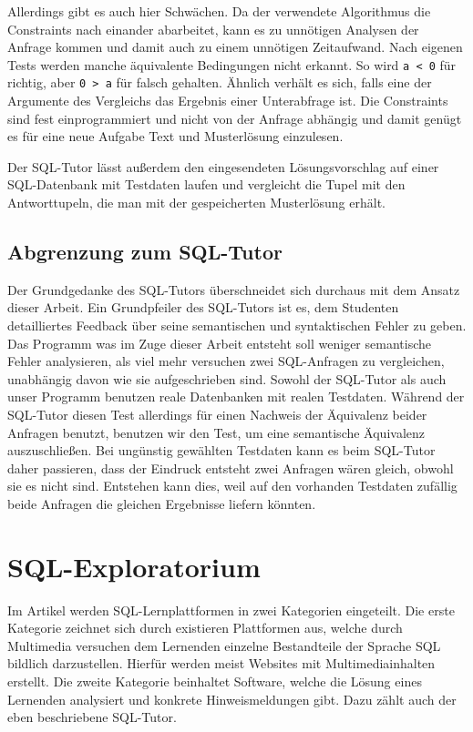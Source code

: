 Allerdings gibt es auch hier Schwächen. Da der verwendete Algorithmus die Constraints nach einander abarbeitet, kann es zu unnötigen Analysen der Anfrage kommen und damit auch zu einem unnötigen Zeitaufwand. Nach eigenen Tests werden manche äquivalente Bedingungen nicht erkannt. So wird \verb|a < 0| für richtig, aber \verb|0 > a| für falsch gehalten. Ähnlich verhält es sich, falls eine der Argumente des Vergleichs das Ergebnis einer Unterabfrage ist. Die Constraints sind fest einprogrammiert und nicht von der Anfrage abhängig und damit genügt es für eine neue Aufgabe Text und Musterlösung einzulesen. 

Der SQL-Tutor lässt außerdem den eingesendeten Lösungsvorschlag auf einer SQL-Datenbank mit Testdaten laufen und vergleicht die Tupel mit den Antworttupeln, die man mit der gespeicherten Musterlösung erhält.

\subsection*{Abgrenzung zum SQL-Tutor}

Der Grundgedanke des SQL-Tutors überschneidet sich durchaus mit dem Ansatz dieser Arbeit. Ein Grundpfeiler des SQL-Tutors ist es, dem Studenten detailliertes Feedback über seine semantischen und syntaktischen Fehler zu geben. Das Programm was im Zuge dieser Arbeit entsteht soll weniger semantische Fehler analysieren, als viel mehr versuchen zwei SQL-Anfragen zu vergleichen, unabhängig davon wie sie aufgeschrieben sind. Sowohl der SQL-Tutor als auch unser Programm benutzen reale Datenbanken mit realen Testdaten. Während der SQL-Tutor diesen Test allerdings für einen Nachweis der Äquivalenz beider Anfragen benutzt, benutzen wir den Test, um eine semantische Äquivalenz auszuschließen. Bei ungünstig gewählten Testdaten kann es beim SQL-Tutor daher passieren, dass der Eindruck entsteht zwei Anfragen wären gleich, obwohl sie es nicht sind. Entstehen kann dies, weil auf den vorhanden Testdaten zufällig beide Anfragen die gleichen Ergebnisse liefern könnten.

\section{SQL-Exploratorium}

Im Artikel \cite{explora1} werden SQL-Lernplattformen in zwei Kategorien eingeteilt. Die erste Kategorie zeichnet sich durch existieren Plattformen aus, welche durch Multimedia versuchen dem Lernenden einzelne Bestandteile der Sprache SQL bildlich darzustellen. Hierfür werden meist Websites mit Multimediainhalten erstellt. Die zweite Kategorie beinhaltet Software, welche die Lösung eines Lernenden analysiert und konkrete Hinweismeldungen gibt. Dazu zählt auch der eben beschriebene SQL-Tutor.

